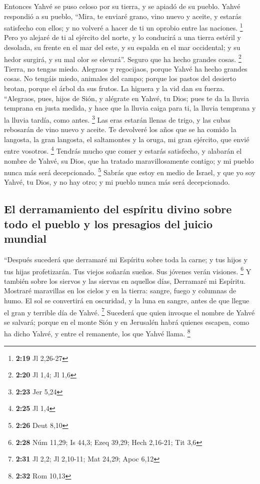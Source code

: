  Entonces Yahvé se puso celoso por su tierra, y se apiadó
de su pueblo.  Yahvé respondió a su pueblo, ``Mira, te
enviaré grano, vino nuevo y aceite, y estarás satisfecho con ellos; y no
volveré a hacer de ti un oprobio entre las naciones. \footnote{\textbf{2:19}
  Jl 2,26-27}  Pero yo alejaré de ti al ejército del
norte, y lo conducirá a una tierra estéril y desolada, su frente en el
mar del este, y su espalda en el mar occidental; y su hedor surgirá, y
su mal olor se elevará''. Seguro que ha hecho grandes cosas. \footnote{\textbf{2:20}
  Jl 1,4; Jl 1,6}  Tierra, no tengas miedo. Alegraos y
regocijaos, porque Yahvé ha hecho grandes cosas.  No
tengáis miedo, animales del campo; porque los pastos del desierto
brotan, porque el árbol da sus frutos. La higuera y la vid dan su
fuerza.  ``Alegraos, pues, hijos de Sión, y alégrate en
Yahvé, tu Dios; pues te da la lluvia temprana en justa medida, y hace
que la lluvia caiga para ti, la lluvia temprana y la lluvia tardía, como
antes. \footnote{\textbf{2:23} Jer 5,24}  Las eras
estarán llenas de trigo, y las cubas rebosarán de vino nuevo y aceite.
 Te devolveré los años que se ha comido la langosta, la
gran langosta, el saltamontes y la oruga, mi gran ejército, que envié
entre vosotros. \footnote{\textbf{2:25} Jl 1,4}  Tendrás
mucho que comer y estarás satisfecho, y alabarán el nombre de Yahvé, su
Dios, que ha tratado maravillosamente contigo; y mi pueblo nunca más
será decepcionado. \footnote{\textbf{2:26} Deut 8,10} 
Sabrás que estoy en medio de Israel, y que yo soy Yahvé, tu Dios, y no
hay otro; y mi pueblo nunca más será decepcionado.

\hypertarget{el-derramamiento-del-espuxedritu-divino-sobre-todo-el-pueblo-y-los-presagios-del-juicio-mundial}{%
\subsection{El derramamiento del espíritu divino sobre todo el pueblo y
los presagios del juicio
mundial}\label{el-derramamiento-del-espuxedritu-divino-sobre-todo-el-pueblo-y-los-presagios-del-juicio-mundial}}

 ``Después sucederá que derramaré mi Espíritu sobre toda
la carne; y tus hijos y tus hijas profetizarán. Tus viejos soñarán
sueños. Sus jóvenes verán visiones. \footnote{\textbf{2:28} Núm 11,29;
  Is 44,3; Ezeq 39,29; Hech 2,16-21; Tit 3,6}  Y también
sobre los siervos y las siervas en aquellos días, Derramaré mi Espíritu.
 Mostraré maravillas en los cielos y en la tierra:
sangre, fuego y columnas de humo.  El sol se convertirá
en oscuridad, y la luna en sangre, antes de que llegue el gran y
terrible día de Yahvé. \footnote{\textbf{2:31} Jl 2,2; Jl 2,10-11; Mat
  24,29; Apoc 6,12}  Sucederá que quien invoque el nombre
de Yahvé se salvará; porque en el monte Sión y en Jerusalén habrá
quienes escapen, como ha dicho Yahvé, y entre el remanente, los que
Yahvé llama. \footnote{\textbf{2:32} Rom 10,13}

